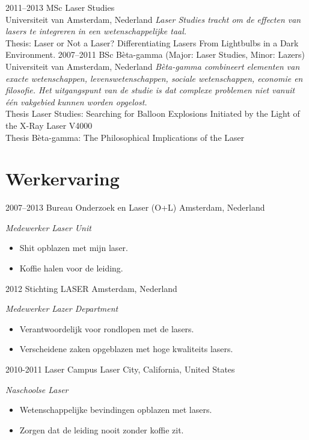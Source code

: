 \documentclass[]{friggeri-cv} %
\begin{document}
\begin{entrylist}
\entry
{2011--2013}
{MSc {\normalfont Laser Studies}}
{\\Universiteit van Amsterdam, Nederland}
{\emph{Laser Studies tracht om de effecten van lasers te integreren in een wetenschappelijke taal.} \\ Thesis: Laser or Not a Laser? Differentiating Lasers From Lightbulbs in a Dark Environment.}
\entry
{2007--2011}
{BSc {\normalfont Bèta-gamma (Major: Laser Studies, Minor: Lazers)}}
{\\Universiteit van Amsterdam, Nederland}
{\emph{Bèta-gamma combineert elementen van exacte wetenschappen, levenswetenschappen, sociale wetenschappen, economie en filosofie. Het uitgangspunt van de studie is dat complexe problemen niet vanuit één vakgebied kunnen worden opgelost. } \\
Thesis Laser Studies: Searching for Balloon Explosions Initiated by the Light of the X-Ray Laser V4000 \\
Thesis Bèta-gamma: The Philosophical Implications of the Laser}
\end{entrylist}


\section{Werkervaring}

\begin{entrylist}
\entry
{2007--2013}
{Bureau Onderzoek en Laser (O+L)}
{Amsterdam, Nederland}
{\emph{Medewerker Laser Unit}
\begin{itemize}
\item Shit opblazen met mijn laser.
\item Koffie halen voor de leiding.
\end{itemize}}
\entry
{2012}
{Stichting LASER}
{Amsterdam, Nederland}
{\emph{Medewerker Lazer Department}
\begin{itemize}
\item Verantwoordelijk voor rondlopen met de lasers.
\item Verscheidene zaken opgeblazen met hoge kwaliteits lasers.
\end{itemize}}
\entry
{2010-2011}
{Laser Campus}
{Laser City, California, United States}
{\emph{Naschoolse Laser}
\begin{itemize}
\item Wetenschappelijke bevindingen opblazen met lasers.
\item Zorgen dat de leiding nooit zonder koffie zit.
\end{itemize}}
\end{entrylist}
\end{document}
